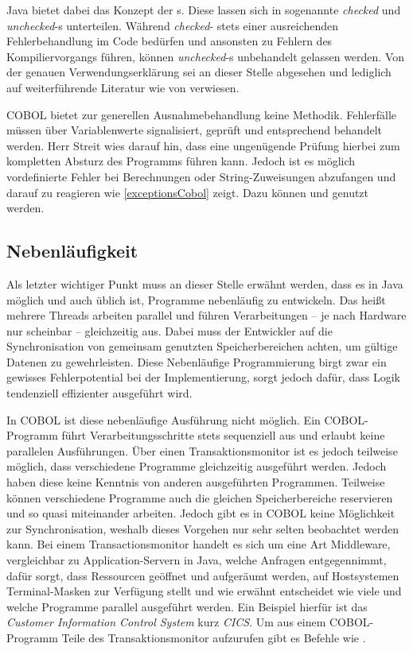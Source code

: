 Java bietet dabei das Konzept der s. Diese lassen sich in sogenannte \textit{checked} und \textit{unchecked}-s unterteilen. Während \textit{checked}- stets einer ausreichenden Fehlerbehandlung im Code bedürfen und ansonsten zu Fehlern des Kompiliervorgangs führen, können \textit{unchecked}-s unbehandelt gelassen werden. Von der genauen Verwendungserklärung sei an dieser Stelle abgesehen und lediglich auf weiterführende Literatur wie  von \citeauthor{byrne_java_2009-1} verwiesen.

COBOL bietet zur generellen Ausnahmebehandlung keine Methodik. Fehlerfälle müssen über Variablenwerte signalisiert, geprüft und entsprechend behandelt werden. Herr Streit wies darauf hin, dass eine ungenügende Prüfung hierbei zum kompletten Absturz des Programms führen kann. Jedoch ist es möglich vordefinierte Fehler bei Berechnungen oder String-Zuweisungen abzufangen und darauf zu reagieren wie \autoref{exceptionsCobol} zeigt. Dazu können  und  genutzt werden.


\subsection{Nebenläufigkeit}

Als letzter wichtiger Punkt muss an dieser Stelle erwähnt werden, dass es in Java möglich und auch üblich ist, Programme nebenläufig zu entwickeln. Das heißt mehrere Threads arbeiten parallel und führen Verarbeitungen -- je nach Hardware nur scheinbar -- gleichzeitig aus. Dabei muss der Entwickler auf die Synchronisation von gemeinsam genutzten Speicherbereichen achten, um gültige Datenen zu gewehrleisten. Diese Nebenläufige Programmierung birgt zwar ein gewisses Fehlerpotential bei der Implementierung, sorgt jedoch dafür, dass Logik tendenziell effizienter ausgeführt wird.

In COBOL ist diese nebenläufige Ausführung nicht möglich. Ein COBOL-Programm führt Verarbeitungsschritte stets sequenziell aus und erlaubt keine parallelen Ausführungen. Über einen Transaktionsmonitor ist es jedoch teilweise möglich, dass verschiedene Programme gleichzeitig ausgeführt werden. Jedoch haben diese keine Kenntnis von anderen ausgeführten Programmen. Teilweise können verschiedene Programme auch die gleichen Speicherbereiche reservieren und so quasi miteinander arbeiten. Jedoch gibt es in COBOL keine Möglichkeit zur Synchronisation, weshalb dieses Vorgehen nur sehr selten beobachtet werden kann. Bei einem Transactionsmonitor handelt es sich um eine Art Middleware, vergleichbar zu Application-Servern in Java, welche Anfragen entgegennimmt, dafür sorgt, dass Ressourcen geöffnet und aufgeräumt werden, auf Hostsystemen Terminal-Masken zur Verfügung stellt und wie erwähnt entscheidet wie viele und welche Programme parallel ausgeführt werden. Ein Beispiel hierfür ist das \textit{Customer Information Control System} kurz \textit{CICS}. Um aus einem COBOL-Programm Teile des Transaktionsmonitor aufzurufen gibt es Befehle wie . 